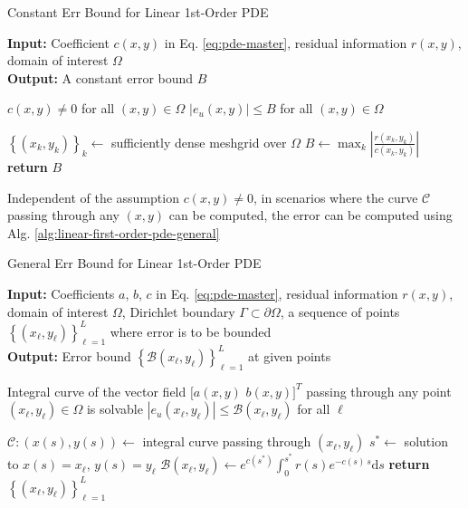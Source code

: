 \documentclass[accepted]{uai2023}
\newcommand{\Err}{e}
\newcommand{\Bound}{\mathcal{B}}
\begin{document}
    \begin{algorithm}
        \small
        \caption{Constant Err Bound for Linear 1st-Order PDE}\label{alg:linear-first-order-pde-constant}
        \textbf{Input:} Coefficient $c(x, y)$ in Eq. \ref{eq:pde-master}, residual information $r(x, y)$, domain of interest $\Omega$\\
        \textbf{Output:} A constant error bound $B$
        \begin{algorithmic}
            \Require $c(x, y) \neq 0$ for all $(x, y) \in \Omega$
            \Ensure $|\Err_{u}(x, y)| \leq B$ for all $(x, y) \in \Omega$

            \vspace{0.5em}
            \State $\left\{(x_k, y_k)\right\}_{k} \gets$ sufficiently dense meshgrid over $\Omega$
            \State $\displaystyle B \gets \max_{k} \left| \frac{r(x_k, y_k)}{c(x_k, y_k)}\right|$
            \State \textbf{return} $B$
        \end{algorithmic}
    \end{algorithm}

    Independent of the assumption $c(x, y)\neq 0$, in scenarios where the curve $\mathcal{C}$ passing through any $(x, y)$ can be computed, the error can be computed using Alg. \ref{alg:linear-first-order-pde-general}

    \begin{algorithm}
        \small
        \caption{General Err Bound for Linear 1st-Order PDE}\label{alg:linear-first-order-pde-general}
        \textbf{Input:} Coefficients $a$, $b$, $c$ in Eq. \ref{eq:pde-master}, residual information $r(x, y)$, domain of interest $\Omega$, Dirichlet boundary $\Gamma\subset \partial \Omega$, a sequence of points $\left\{(x_\ell, y_\ell)\right\}_{\ell=1}^{L}$ where error is to be bounded\\
        \textbf{Output:} Error bound $\left\{\Bound(x_\ell, y_\ell)\right\}_{\ell=1}^{L}$ at given points
        \begin{algorithmic}
            \Require Integral curve of the vector field $\big[a(x, y)\,\, b(x, y)\big]^T$ passing through any point $(x_\ell, y_\ell) \in \Omega$ is solvable
            \Ensure $|\Err_{u}(x_\ell, y_\ell)| \leq \Bound(x_\ell, y_\ell)$ for all $\ell$

            \vspace{0.5em}
                \State $\mathcal{C}:(x(s), y(s))\gets$ integral curve passing through $(x_\ell, y_\ell)$
                \State $s^* \gets$ solution to $x(s) = x_\ell,\, y(s)=y_\ell$
                \State $\displaystyle \Bound(x_\ell, y_\ell) \gets e^{c(s^*)}\int_{0}^{s^*}r(s) e^{-c(s)\,s}\mathrm{d}s$ 
            \EndFor
            \State \textbf{return} $\left\{(x_\ell, y_\ell)\right\}_{\ell=1}^{L}$
        \end{algorithmic}
    \end{algorithm}
\end{document}
